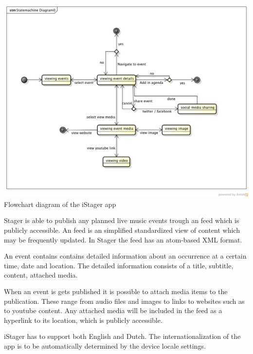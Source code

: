 \begin{centering}
	\includegraphics[scale=0.4]{images/stagerapp_statediagram.png}\\{Flowchart diagram of the iStager app}\\
\end{centering}


Stager is able to publish any planned live music events trough an feed which is publicly accessible. An feed is an simplified standardized view of content which may be frequently updated. In Stager the feed has an atom-based XML format.

An event contains contains detailed information about an occurrence at a certain time, date and location. The detailed information consists of a title, subtitle, content, attached media. 

When an event is gets published it is possible to attach media items to the publication. These range from audio files and images to  links to websites such as to youtube content. Any attached media will be included in the feed as a hyperlink to its location, which is publicly accessible.

iStager has to support both English and Dutch. The internationalization of the app is to be automatically determined by the device locale settings. 



